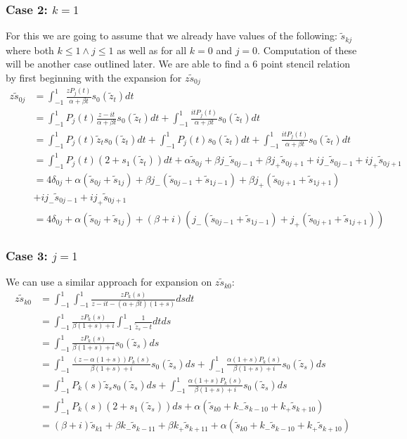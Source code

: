 \documentclass{article}
\begin{document}
\subsubsection{Case 2: $k=1$}
For this we are going to assume that we already have values of the following: $\tilde{s}_{kj}$ where both $k\leq1 \wedge j\leq1$ as well as for all $k=0$ and $j=0$.
Computation of these will be another case outlined later.
We are able to find a 6 point stencil relation by first beginning with the expansion for $z\tilde{s}_{0j}$
\begin{align}
    z\tilde{s}_{0j}&=\int_{-1}^1\frac{zP_j(t)}{\alpha+\beta t}s_0(\tilde{z}_t)dt\\
    &= \int_{-1}^1P_j(t)\frac{z-it}{\alpha+\beta t}s_0(\tilde{z}_t)dt
    +\int_{-1}^1\frac{itP_j(t)}{\alpha+\beta t}s_0(\tilde{z}_t)dt\\
    &= \int_{-1}^1P_j(t)\tilde{z}_ts_0(\tilde{z}_t)dt
    +\int_{-1}^1P_j(t)s_0(\tilde{z}_t)dt
    +\int_{-1}^1\frac{itP_j(t)}{\alpha+\beta t}s_0(\tilde{z}_t)dt\\
    &= \int_{-1}^1P_j(t)(2+s_1(\tilde{z}_t))dt
    +\alpha \tilde{s}_{0j}+\beta j_-\tilde{s}_{0j-1}+\beta j_+\tilde{s}_{0j+1}
    +i j_-\tilde{s}_{0j-1}+i j_+\tilde{s}_{0j+1}\\
    &=4\delta_{0j}+\alpha(\tilde{s}_{0j}+\tilde{s}_{1j})
    +\beta j_-(\tilde{s}_{0j-1}+\tilde{s}_{1j-1})+\beta j_+(\tilde{s}_{0j+1}+\tilde{s}_{1j+1})\\
    &+i j_-\tilde{s}_{0j-1}+i j_+\tilde{s}_{0j+1} \\
    &=4\delta_{0j}+\alpha(\tilde{s}_{0j}+\tilde{s}_{1j})
    +(\beta+i)(j_-(\tilde{s}_{0j-1}+\tilde{s}_{1j-1})+j_+(\tilde{s}_{0j+1}+\tilde{s}_{1j+1}))
\end{align}

\subsubsection{Case 3: $j=1$}
We can use a similar approach for expansion on $z\tilde{s}_{k0}$:
\begin{align}
    z\tilde{s}_{k0} &= \int_{-1}^1\int_{-1}^1\frac{zP_k(s)}{z-it-(\alpha+\beta t)(1+s)}dsdt\\
    &=\int_{-1}^1\frac{zP_k(s)}{\beta(1+s)+i}\int_{-1}^1\frac{1}{\tilde{z}_s-t}dtds\\
    &=\int_{-1}^1\frac{zP_k(s)}{\beta(1+s)+i}s_0(\tilde{z}_s)ds\\
    &=\int_{-1}^1\frac{(z-\alpha(1+s))P_k(s)}{\beta(1+s)+i}s_0(\tilde{z}_s)ds
    +\int_{-1}^1\frac{\alpha(1+s)P_k(s)}{\beta(1+s)+i}s_0(\tilde{z}_s)ds\\
    &=\int_{-1}^1P_k(s)\tilde{z}_ss_0(\tilde{z}_s)ds
    +\int_{-1}^1\frac{\alpha(1+s)P_k(s)}{\beta(1+s)+i}s_0(\tilde{z}_s)ds\\
    &=\int_{-1}^1P_k(s)(2+s_1(\tilde{z}_s))ds+\alpha(\tilde{s}_{k0}+k_-\tilde{s}_{k-10}+k_+\tilde{s}_{k+10})\\
    &=(\beta+i)\tilde{s}_{k1}+\beta k_-\tilde{s}_{k-11}+\beta k_+\tilde{s}_{k+11}
    +\alpha(\tilde{s}_{k0}+k_-\tilde{s}_{k-10}+k_+\tilde{s}_{k+10})\\
\end{align}
\end{document}
